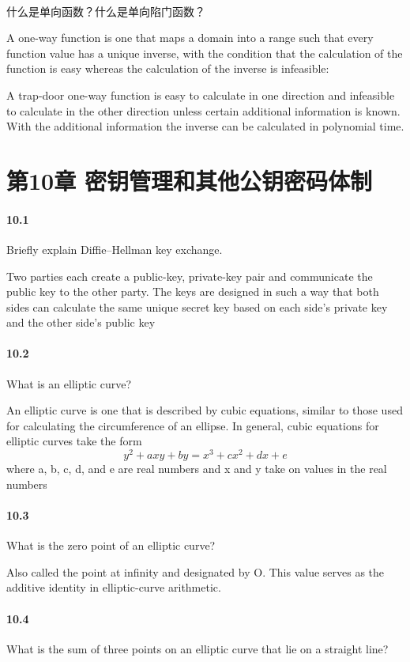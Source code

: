\documentclass[UTF8]{article}
\begin{document}
\paragraph{}
什么是单向函数？什么是单向陷门函数？

A one-way function is one that maps a domain into a range such that every function value has a unique inverse, with the condition that the calculation of the function is easy whereas the calculation of the inverse is infeasible:

A trap-door one-way function is easy to calculate in one direction and infeasible to calculate in the other direction unless certain additional information is known. With the additional information the inverse can be calculated in polynomial time.

\section{第10章 密钥管理和其他公钥密码体制}
\paragraph{10.1}
Briefly explain Diffie–Hellman key exchange.

Two parties each create a public-key, private-key pair and communicate the public key to the other party. The keys are designed in such a way that both sides can calculate the same unique secret key based on each side's private key and the other side's public key
\paragraph{10.2}
What is an elliptic curve?

An elliptic curve is one that is described by cubic equations, similar to those used for calculating the circumference of an ellipse. In general, cubic equations for elliptic curves take the form
$$ y^2 + axy + by = x^3 + cx^2 + dx + e $$
where a, b, c, d, and e are real numbers and x and y take on values in the real numbers
\paragraph{10.3}
What is the zero point of an elliptic curve?

Also called the point at infinity and designated by O. This value serves as the additive identity in elliptic-curve arithmetic.
\paragraph{10.4}
What is the sum of three points on an elliptic curve that lie on a straight line?
\end{document}
